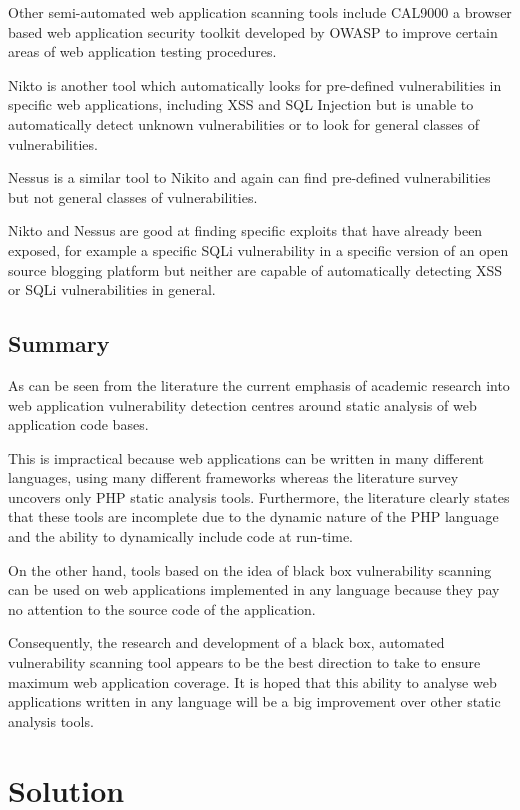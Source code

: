 \documentclass[12pt,a4paper]{article}
\begin{document}
Other semi-automated web application scanning tools include CAL9000 \cite{Loomis:2009:Online} a browser based web application security toolkit developed by OWASP to improve certain areas of web application testing procedures. \cite{Grossman2007}

Nikto is another tool which automatically looks for pre-defined vulnerabilities in specific web applications, including XSS and SQL Injection but is unable to automatically detect unknown vulnerabilities or to look for general classes of vulnerabilities. \cite{Nikto:2009:Online} 

Nessus is a similar tool to Nikito and again can find pre-defined vulnerabilities but not general classes of vulnerabilities. \cite{Nessus:2010:Online}

Nikto and Nessus are good at finding specific exploits that have already been exposed, for example a specific SQLi vulnerability in a specific version of an open source blogging platform but neither are capable of automatically detecting XSS or SQLi vulnerabilities in general.

\subsection{Summary}
As can be seen from the literature the current emphasis of academic research into web application vulnerability detection centres around static analysis of web application code bases.

This is impractical because web applications can be written in many different languages, using many different frameworks whereas the literature survey uncovers only PHP static analysis tools.  Furthermore, the literature clearly states that these tools are incomplete due to the dynamic nature of the PHP language and the ability to dynamically include code at run-time.

On the other hand, tools based on the idea of black box vulnerability scanning can be used on web applications implemented in any language because they pay no attention to the source code of the application.

Consequently, the research and development of a black box, automated vulnerability scanning tool appears to be the best direction to take to ensure maximum web application coverage.  It is hoped that this ability to analyse web applications written in any language will be a big improvement over other static analysis tools.

\section{Solution}
\end{document}
